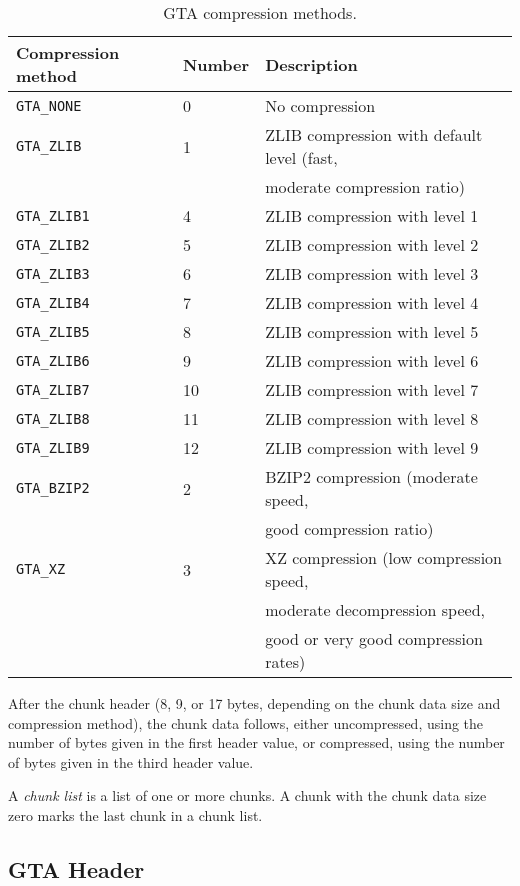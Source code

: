 \documentclass[a4paper,11pt]{article}
\newcommand{\code}[1]{\texttt{#1}}
\begin{document}
\begin{table}
\begin{tabular}{l|l|l}
Compression method & Number & Description\\\hline
\code{GTA\_NONE}  & 0 & No compression \\
\code{GTA\_ZLIB}  & 1 & ZLIB compression with default level (fast,\\
                  &   & moderate compression ratio) \\
\code{GTA\_ZLIB1} & 4 & ZLIB compression with level 1\\
\code{GTA\_ZLIB2} & 5 & ZLIB compression with level 2\\
\code{GTA\_ZLIB3} & 6 & ZLIB compression with level 3\\
\code{GTA\_ZLIB4} & 7 & ZLIB compression with level 4\\
\code{GTA\_ZLIB5} & 8 & ZLIB compression with level 5\\
\code{GTA\_ZLIB6} & 9 & ZLIB compression with level 6\\
\code{GTA\_ZLIB7} & 10& ZLIB compression with level 7\\
\code{GTA\_ZLIB8} & 11& ZLIB compression with level 8\\
\code{GTA\_ZLIB9} & 12& ZLIB compression with level 9\\
\code{GTA\_BZIP2} & 2 & BZIP2 compression (moderate speed,\\
                  &   & good compression ratio) \\
\code{GTA\_XZ}    & 3 & XZ compression (low compression speed,\\
                  &   & moderate decompression speed,\\
		  &   & good or very good compression rates) \\
\end{tabular}
\caption{GTA compression methods.}
\label{tab:compression}
\end{table}

After the chunk header (8, 9, or 17 bytes, depending on the chunk data size
and compression method), the chunk data follows, either uncompressed, using
the number of bytes given in the first header value, or compressed, using
the number of bytes given in the third header value.

A \emph{chunk list} is a list of one or more chunks. A chunk with the chunk
data size zero marks the last chunk in a chunk list.

\subsection{GTA Header}
\end{document}
